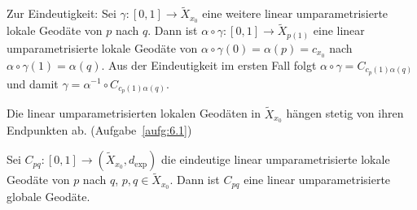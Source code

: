 \begin{beweis}
\begin{description}
		Zur Eindeutigkeit:
		Sei $\gamma \colon [0,1] \rightarrow \tilde{X}_{x_0}$ eine weitere linear umparametrisierte lokale Geodäte von $p$ nach $q$.
		Dann ist $\alpha \circ \gamma \colon [0,1] \rightarrow \tilde{X}_{p(1)}$ eine linear umparametrisierte lokale Geodäte von $\alpha \circ \gamma(0) = \alpha(p) = c_{x_0}$ nach $\alpha \circ \gamma(1) = \alpha(q)$.
		Aus der Eindeutigkeit im ersten Fall folgt $\alpha \circ \gamma = C_{c_p(1)\alpha(q)}$ und damit $\gamma = \alpha^{-1} \circ C_{c_p(1)\alpha(q)}$. 
	\end{description}
\end{beweis}

\begin{lemma}
\label{lemma:2.39}
	Die linear umparametrisierten lokalen Geodäten in $\tilde{X}_{x_0}$ hängen stetig von ihren Endpunkten ab. (Aufgabe~\ref{aufg:6.1})
\end{lemma}

\begin{lemma}
\label{lemma:2.40}
	Sei $C_{pq}\colon [0,1] \rightarrow (\tilde{X}_{x_0},d_{\exp})$ die eindeutige linear umparametrisierte lokale Geodäte von $p$ nach $q$, $p,q \in \tilde{X}_{x_0}$.
	Dann ist $C_{pq}$ eine linear umparametrisierte globale Geodäte.
\end{lemma}

